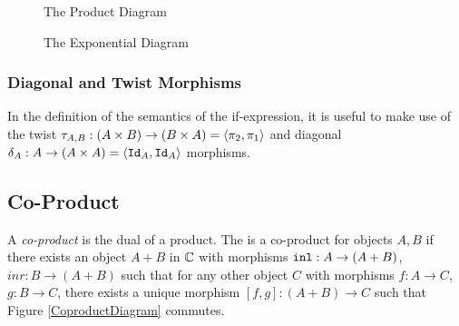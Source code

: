 \documentclass{Report}
\begin{document}
\begin{minipage}{0.47\linewidth}
    \begin{figure}[H]
        \begin{framed}
            \centering
            \begin{center}
            \end{center}
        \end{framed}
        \caption{The Product Diagram}
        \label{ProductDiagram}
    \end{figure}
\end{minipage}\quad
\begin{minipage}{0.47\linewidth}
    \begin{figure}[H]
        \begin{framed}
            \centering
            \begin{center}
            \end{center}
        \end{framed}
        \caption{The Exponential Diagram}
        \label{ExponentialDiagram}
    \end{figure}
\end{minipage}\quad


\subsubsection{Diagonal and Twist Morphisms}
In the definition of the semantics of the if-expression, it is useful to make use of the twist $\tau_{A, B}: (A\times B) \rightarrow (B\times A) = \langle\pi_2, \pi_1\rangle$ and diagonal $\delta_{A}: A \rightarrow (A\times A)  = \langle\texttt{Id}_{A}, \texttt{Id}_{A}\rangle$ morphisms.

\subsection{Co-Product}
A \textit{co-product} is the dual of a product. The is a co-product for objects $A, B$ if there exists an object $A+B$ in $\mathbb{C}$ with morphisms $\texttt{inl}: A\rightarrow (A+B)$, $inr: B\rightarrow (A+B)$ such that for any other object $C$ with morphisms $f: A\rightarrow C$, $g: B\rightarrow C$, there exists a unique morphism $[f, g]: (A + B)\rightarrow C $ such that Figure \ref{CoproductDiagram} commutes.
\end{document}
